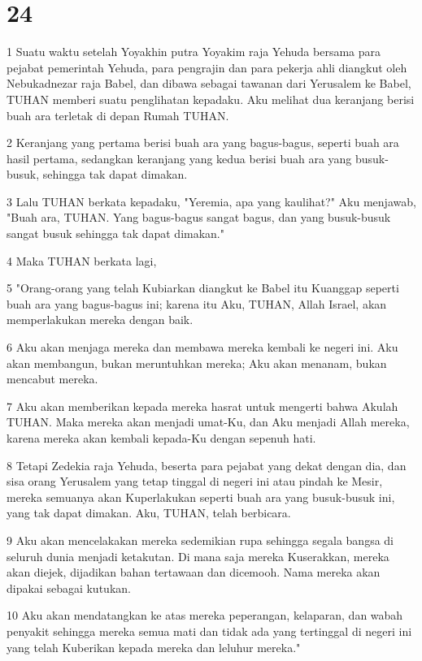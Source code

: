 \chapter{24}

\par 1 Suatu waktu setelah Yoyakhin putra Yoyakim raja Yehuda bersama para pejabat pemerintah Yehuda, para pengrajin dan para pekerja ahli diangkut oleh Nebukadnezar raja Babel, dan dibawa sebagai tawanan dari Yerusalem ke Babel, TUHAN memberi suatu penglihatan kepadaku. Aku melihat dua keranjang berisi buah ara terletak di depan Rumah TUHAN.
\par 2 Keranjang yang pertama berisi buah ara yang bagus-bagus, seperti buah ara hasil pertama, sedangkan keranjang yang kedua berisi buah ara yang busuk-busuk, sehingga tak dapat dimakan.
\par 3 Lalu TUHAN berkata kepadaku, "Yeremia, apa yang kaulihat?" Aku menjawab, "Buah ara, TUHAN. Yang bagus-bagus sangat bagus, dan yang busuk-busuk sangat busuk sehingga tak dapat dimakan."
\par 4 Maka TUHAN berkata lagi,
\par 5 "Orang-orang yang telah Kubiarkan diangkut ke Babel itu Kuanggap seperti buah ara yang bagus-bagus ini; karena itu Aku, TUHAN, Allah Israel, akan memperlakukan mereka dengan baik.
\par 6 Aku akan menjaga mereka dan membawa mereka kembali ke negeri ini. Aku akan membangun, bukan meruntuhkan mereka; Aku akan menanam, bukan mencabut mereka.
\par 7 Aku akan memberikan kepada mereka hasrat untuk mengerti bahwa Akulah TUHAN. Maka mereka akan menjadi umat-Ku, dan Aku menjadi Allah mereka, karena mereka akan kembali kepada-Ku dengan sepenuh hati.
\par 8 Tetapi Zedekia raja Yehuda, beserta para pejabat yang dekat dengan dia, dan sisa orang Yerusalem yang tetap tinggal di negeri ini atau pindah ke Mesir, mereka semuanya akan Kuperlakukan seperti buah ara yang busuk-busuk ini, yang tak dapat dimakan. Aku, TUHAN, telah berbicara.
\par 9 Aku akan mencelakakan mereka sedemikian rupa sehingga segala bangsa di seluruh dunia menjadi ketakutan. Di mana saja mereka Kuserakkan, mereka akan diejek, dijadikan bahan tertawaan dan dicemooh. Nama mereka akan dipakai sebagai kutukan.
\par 10 Aku akan mendatangkan ke atas mereka peperangan, kelaparan, dan wabah penyakit sehingga mereka semua mati dan tidak ada yang tertinggal di negeri ini yang telah Kuberikan kepada mereka dan leluhur mereka."

